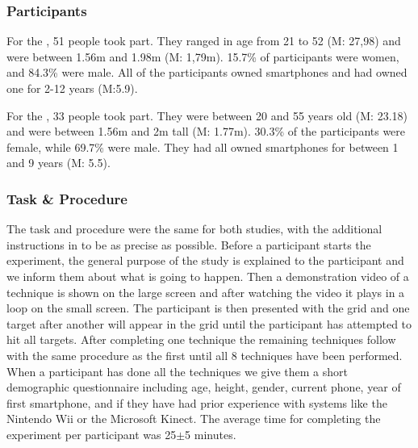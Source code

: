 \subsubsection{Participants}
For the \target, 51 people took part. 
They ranged in age from 21 to 52 (M: 27,98) and were between 1.56m and 1.98m (M: 1,79m). 
15.7\% of participants were women, and 84.3\% were male.
All of the participants owned smartphones and had owned one for 2-12 years (M:5.9).

For the \accuracy, 33 people took part. They were between 20 and 55 years old (M: 23.18) and were between 1.56m and 2m tall (M: 1.77m).
30.3\% of the participants were female, while 69.7\% were male.
They had all owned smartphones for between 1 and 9 years (M: 5.5).

\subsubsection{Task \& Procedure} \label{sec:procedure}
The task and procedure were the same for both studies, with the additional instructions in \accuracy to be as precise as possible.
Before a participant starts the experiment, the general purpose of the study is explained to the participant and we inform them about what is going to happen.
Then a demonstration video of a technique is shown on the large screen and after watching the video it plays in a loop on the small screen.
The participant is then presented with the grid and one target after another will appear in the grid until the participant has attempted to hit all targets.
After completing one technique the remaining techniques follow with the same procedure as the first until all 8 techniques have been performed.
When a participant has done all the techniques we give them a short demographic questionnaire including age, height, gender, current phone, year of first smartphone, and if they have had prior experience with systems like the Nintendo Wii or the Microsoft Kinect.
The average time for completing the experiment per participant was 25$\pm$5 minutes. 